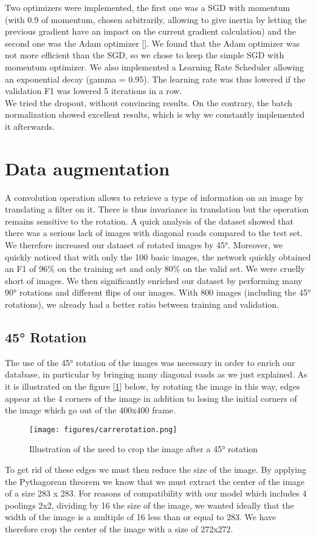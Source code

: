\documentclass[10pt,conference,compsocconf]{IEEEtran}
\begin{document}
Two optimizers were implemented, the first one was a SGD with momentum (with 0.9 of momentum, chosen arbitrarily, allowing to give inertia by letting the previous gradient have an impact on the current gradient calculation) and the second one was the Adam optimizer [\cite{adam}]. We found that the Adam optimizer was not more efficient than the SGD, so we chose to keep the simple SGD with momentum optimizer.
We also implemented a Learning Rate Scheduler allowing an exponential decay (gamma = 0.95). The learning rate was thus lowered if the validation F1 was lowered 5 iterations in a row. \\
We tried the dropout, without convincing results. On the contrary, the batch normalization showed excellent results, which is why we constantly implemented it afterwards.

\section{Data augmentation}

A convolution operation allows to retrieve a type of information on an image by translating a filter on it. There is thus invariance in translation but the operation remains sensitive to the rotation. A quick analysis of the dataset showed that there was a serious lack of images with diagonal roads compared to the test set. We therefore increased our dataset of rotated images by 45°.
Moreover, we quickly noticed that with only the 100 basic images, the network quickly obtained an F1 of 96$\%$ on the training set and only 80\% on the valid set. We were cruelly short of images. We then significantly enriched our dataset by performing many 90° rotations and different flips of our images. With 800 images (including the 45° rotations), we already had a better ratio between training and validation.

\subsection{45° Rotation}
The use of the 45° rotation of the images was necessary in order to enrich our database, in particular by bringing many diagonal roads as we just explained. 
As it is illustrated on the figure [\ref{fig:carrerotation}] below, by rotating the image in this way, edges appear at the 4 corners of the image in addition to losing the initial corners of the image which go out of the 400x400 frame.
\FloatBarrier
\begin{figure}[ht] \centering
    \texttt{[image: figures/carrerotation.png]}
    \caption{Illustration of the need to crop the image after a 45° rotation}
    \label{fig:carrerotation}
\end{figure}
\FloatBarrier
To get rid of these edges we must then reduce the size of the image. By applying the Pythagorean theorem we know that we must extract the center of the image of a size 283 x 283. For reasons of compatibility with our model which includes 4 poolings 2x2, dividing by 16 the size of the image, we wanted ideally that the width of the image is a multiple of 16 less than or equal to 283. We have therefore crop the center of the image with a size of 272x272.
\end{document}
